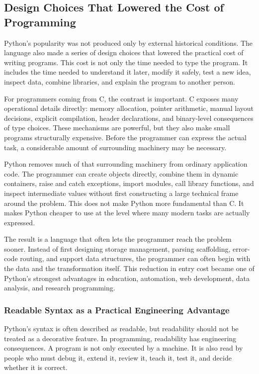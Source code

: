 \subsection{Design Choices That Lowered the Cost of Programming}

Python's popularity was not produced only by external historical conditions. The language also made a series of design choices that lowered the practical cost of writing programs. This cost is not only the time needed to type the program. It includes the time needed to understand it later, modify it safely, test a new idea, inspect data, combine libraries, and explain the program to another person.

For programmers coming from C, the contrast is important. C exposes many operational details directly: memory allocation, pointer arithmetic, manual layout decisions, explicit compilation, header declarations, and binary-level consequences of type choices. These mechanisms are powerful, but they also make small programs structurally expensive. Before the programmer can express the actual task, a considerable amount of surrounding machinery may be necessary.

Python removes much of that surrounding machinery from ordinary application code. The programmer can create objects directly, combine them in dynamic containers, raise and catch exceptions, import modules, call library functions, and inspect intermediate values without first constructing a large technical frame around the problem. This does not make Python more fundamental than C. It makes Python cheaper to use at the level where many modern tasks are actually expressed.

The result is a language that often lets the programmer reach the problem sooner. Instead of first designing storage management, parsing scaffolding, error-code routing, and support data structures, the programmer can often begin with the data and the transformation itself. This reduction in entry cost became one of Python's strongest advantages in education, automation, web development, data analysis, and research programming.

\subsubsection{Readable Syntax as a Practical Engineering Advantage}

Python's syntax is often described as readable, but readability should not be treated as a decorative feature. In programming, readability has engineering consequences. A program is not only executed by a machine. It is also read by people who must debug it, extend it, review it, teach it, test it, and decide whether it is correct.


